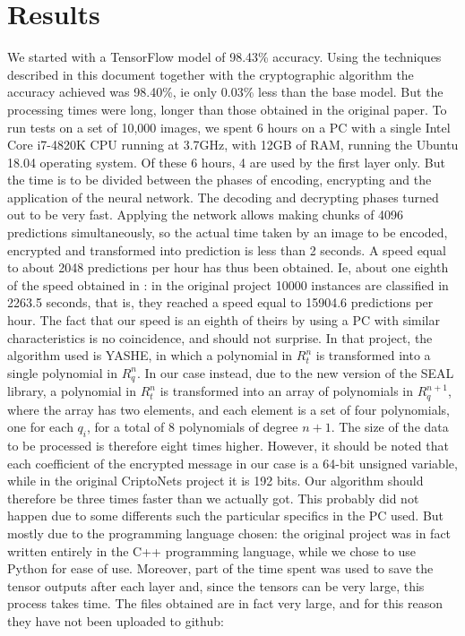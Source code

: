 \section{Results}

We started with a TensorFlow model of 98.43\% accuracy. Using the techniques described in this document together with the cryptographic algorithm the accuracy achieved was 98.40\%, ie only 0.03\% less than the base model. But the processing times were long, longer than those obtained in the original paper. To run tests on a set of 10,000 images, we spent 6 hours on a PC with a single Intel Core i7-4820K CPU running at 3.7GHz, with 12GB of RAM, running the Ubuntu 18.04 operating system. Of these 6 hours, 4 are used by the first layer only. But the time is to be divided between the phases of encoding, encrypting and the application of the neural network. The decoding and decrypting phases turned out to be very fast. Applying the network allows making chunks of 4096 predictions simultaneously, so the actual time taken by an image to be encoded, encrypted and transformed into prediction is less than 2 seconds. A speed equal to about 2048 predictions per hour has thus been obtained. Ie, about one eighth of the speed obtained in \cite{dowlin2016cryptonets}: in the original project 10000 instances are classified in 2263.5 seconds, that is, they reached a speed equal to 15904.6 predictions per hour. The fact that our speed is an eighth of theirs by using a PC with similar characteristics is no coincidence, and should not surprise. In that project, the algorithm used is YASHE, in which a polynomial in $R^n_t$ is transformed into a single polynomial in $R^n_q$. In our case instead, due to the new version of the SEAL library, a polynomial in $R^n_t$ is transformed into an array of polynomials in $R^{n+1}_q$, where the array has two elements, and each element is a set of four polynomials, one for each $q_i$, for a total of 8 polynomials of degree $n+1$. The size of the data to be processed is therefore eight times higher. However, it should be noted that each coefficient of the encrypted message in our case is a 64-bit unsigned variable, while in the original CriptoNets project it is 192 bits. Our algorithm should therefore be three times faster than we actually got. This probably did not happen due to some differents such the particular specifics in the PC used. But mostly due to the programming language chosen: the original project was in fact written entirely in the C++ programming language, while we chose to use Python for ease of use. Moreover, part of the time spent was used to save the tensor outputs after each layer and, since the tensors can be very large, this process takes time. The files obtained are in fact very large, and for this reason they have not been uploaded to github:

